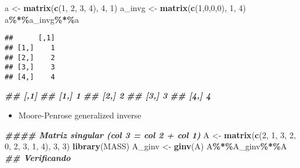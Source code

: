 \documentclass[
]{article}
\newenvironment{Shaded}{\begin{snugshade}}{\end{snugshade}}
\newcommand{\DecValTok}[1]{\textcolor[rgb]{0.00,0.00,0.81}{#1}}
\newcommand{\DocumentationTok}[1]{\textcolor[rgb]{0.56,0.35,0.01}{\textbf{\textit{#1}}}}
\newcommand{\FunctionTok}[1]{\textcolor[rgb]{0.13,0.29,0.53}{\textbf{#1}}}
\newcommand{\NormalTok}[1]{#1}
\newcommand{\OtherTok}[1]{\textcolor[rgb]{0.56,0.35,0.01}{#1}}
\newcommand{\SpecialCharTok}[1]{\textcolor[rgb]{0.81,0.36,0.00}{\textbf{#1}}}
\providecommand{\tightlist}{%
  \setlength{\itemsep}{0pt}\setlength{\parskip}{0pt}}
\begin{document}
\begin{Shaded}
\begin{Highlighting}[]
\NormalTok{a }\OtherTok{\textless{}{-}} \FunctionTok{matrix}\NormalTok{(}\FunctionTok{c}\NormalTok{(}\DecValTok{1}\NormalTok{, }\DecValTok{2}\NormalTok{, }\DecValTok{3}\NormalTok{, }\DecValTok{4}\NormalTok{), }\DecValTok{4}\NormalTok{, }\DecValTok{1}\NormalTok{)}
\NormalTok{a\_invg }\OtherTok{\textless{}{-}} \FunctionTok{matrix}\NormalTok{(}\FunctionTok{c}\NormalTok{(}\DecValTok{1}\NormalTok{,}\DecValTok{0}\NormalTok{,}\DecValTok{0}\NormalTok{,}\DecValTok{0}\NormalTok{), }\DecValTok{1}\NormalTok{, }\DecValTok{4}\NormalTok{)}
\NormalTok{a}\SpecialCharTok{\%*\%}\NormalTok{a\_invg}\SpecialCharTok{\%*\%}\NormalTok{a}
\end{Highlighting}
\end{Shaded}

\begin{verbatim}
##      [,1]
## [1,]    1
## [2,]    2
## [3,]    3
## [4,]    4
\end{verbatim}

\begin{Shaded}
\begin{Highlighting}[]
\DocumentationTok{\#\# [,1]}
\DocumentationTok{\#\# [1,] 1}
\DocumentationTok{\#\# [2,] 2}
\DocumentationTok{\#\# [3,] 3}
\DocumentationTok{\#\# [4,] 4}
\end{Highlighting}
\end{Shaded}

\begin{itemize}
\tightlist
\item
  Moore-Penrose generalized inverse
\end{itemize}

\begin{Shaded}
\begin{Highlighting}[]
\DocumentationTok{\#\#\#\# Matriz singular (col 3 = col 2 + col 1)}
\NormalTok{A }\OtherTok{\textless{}{-}} \FunctionTok{matrix}\NormalTok{(}\FunctionTok{c}\NormalTok{(}\DecValTok{2}\NormalTok{, }\DecValTok{1}\NormalTok{, }\DecValTok{3}\NormalTok{, }\DecValTok{2}\NormalTok{, }\DecValTok{0}\NormalTok{,}
\DecValTok{2}\NormalTok{, }\DecValTok{3}\NormalTok{, }\DecValTok{1}\NormalTok{, }\DecValTok{4}\NormalTok{), }\DecValTok{3}\NormalTok{, }\DecValTok{3}\NormalTok{)}
\FunctionTok{library}\NormalTok{(MASS)}
\NormalTok{A\_ginv }\OtherTok{\textless{}{-}} \FunctionTok{ginv}\NormalTok{(A)}
\NormalTok{A}\SpecialCharTok{\%*\%}\NormalTok{A\_ginv}\SpecialCharTok{\%*\%}\NormalTok{A }\DocumentationTok{\#\# Verificando}
\end{Highlighting}
\end{Shaded}
\end{document}
